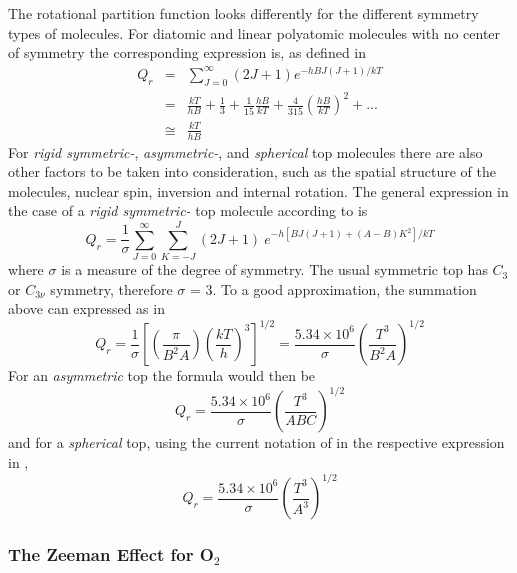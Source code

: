 The rotational partition function looks differently for the different
symmetry types of molecules.
For diatomic and linear  polyatomic molecules with no center of
symmetry the corresponding expression is, as defined in \citet{gordyandcook:70}
\begin{eqnarray}\label{eq:abs_theory:rot_partition}
Q_r & = & \sum_{J=0}^\infty (2J+1)e^{-hBJ(J+1)/kT}\nonumber\\
   & = & \frac{kT}{hB}+\frac{1}{3}+\frac{1}{15}\frac{hB}{kT}+\frac{4}{315}\left(\frac{hB}{kT}\right)^2+...\nonumber\\
   & \cong & \frac{kT}{hB}
\end{eqnarray}
For {\it{ rigid symmetric-}}, {\it{asymmetric-}}, and {\it{spherical}} top molecules there are also
other factors to be taken into consideration, such as the
spatial structure of the molecules, nuclear spin, inversion and
internal rotation. The general expression in the case of a 
{\it{ rigid symmetric-}} top molecule according to \citet{herzberg:45}
is
\begin{equation}\label{eq:abs_theory:rot_partition_symtop}
Q_r  =  \frac{1}{\sigma}\sum_{J=0}^\infty \sum_{K=-J}^{J}(2J+1)~e^{-h[BJ(J+1)+(A-B)K^2]/kT}
\end{equation}
where $\sigma$ is a measure of the degree of symmetry. The usual
symmetric top has $C_3$ or $C_{3\nu}$ symmetry, therefore $\sigma$ = 3. To a good
approximation, the summation above can expressed as in \citet{gordyandcook:70}
\begin{equation}\label{eq:abs_theory:rot_partition_top_appro}
Q_r  = 
\frac{1}{\sigma}\left[\left(\frac{\pi}{B^2A}\right)\left(\frac{kT}{h}\right)^3\right]^{1/2}=
\frac{5.34\times 10^6}{\sigma}\left(\frac{T^3}{B^{2}A}\right)^{1/2}
\end{equation}
For an  {\it{asymmetric}} top the formula would then be 
\begin{equation}\label{eq:abs_theory:rot_partition_asymtop}
Q_r = \frac{5.34\times 10^6}{\sigma}\left(\frac{T^3}{ABC}\right)^{1/2}
\end{equation}
and for a {\it{spherical}} top, using the current notation of
\citet{gordyandcook:70} in the respective expression in \citet{herzberg:45},
\begin{equation}\label{eq:abs_theory:rot_partition_sphetop}
Q_r = \frac{5.34\times 10^6}{\sigma}\left(\frac{T^3}{A^3}\right)^{1/2}
\end{equation}

\subsubsection{The Zeeman Effect for O$_2$}

